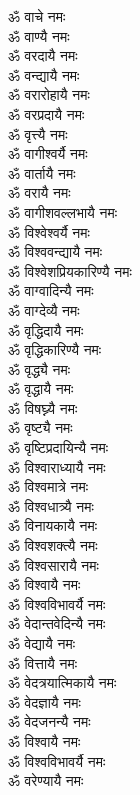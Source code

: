 \begin{flushleft}
\begin{multicols}{2}
ॐ वाचे नमः\\
ॐ वाण्यै नमः\\
ॐ वरदायै नमः\\
ॐ वन्द्यायै नमः\\
ॐ वरारोहायै नमः\\
ॐ वरप्रदायै नमः\\
ॐ वृत्त्यै नमः\\
ॐ वागीश्वर्यै नमः\\
ॐ वार्तायै नमः\\
ॐ वरायै नमः\hfill{}\\
ॐ वागीशवल्लभायै नमः\\
ॐ विश्वेश्वर्यै नमः\\
ॐ विश्ववन्द्यायै नमः\\
ॐ विश्वेशप्रियकारिण्यै नमः\\
ॐ वाग्वादिन्यै नमः\\
ॐ वाग्देव्यै नमः\\
ॐ वृद्धिदायै नमः\\
ॐ वृद्धिकारिण्यै नमः\\
ॐ वृद्ध्यै नमः\\
ॐ वृद्धायै नमः\hfill{}\\
ॐ विषघ्न्यै नमः\\
ॐ वृष्ट्यै नमः\\
ॐ वृष्टिप्रदायिन्यै नमः\\
ॐ विश्वाराध्यायै नमः\\
ॐ विश्वमात्रे नमः\\
ॐ विश्वधात्र्यै नमः\\
ॐ विनायकायै नमः\\
ॐ विश्वशक्त्यै नमः\\
ॐ विश्वसारायै नमः\\
ॐ विश्वायै नमः\hfill{}\\
ॐ विश्वविभावर्यै नमः\\
ॐ वेदान्तवेदिन्यै नमः\\
ॐ वेद्यायै नमः\\
ॐ वित्तायै नमः\\
ॐ वेदत्रयात्मिकायै नमः\\
ॐ वेदज्ञायै नमः\\
ॐ वेदजनन्यै नमः\\
ॐ विश्वायै नमः\\
ॐ विश्वविभावर्यै नमः\\
ॐ वरेण्यायै नमः\hfill{}\\

\end{multicols}
\end{flushleft}
